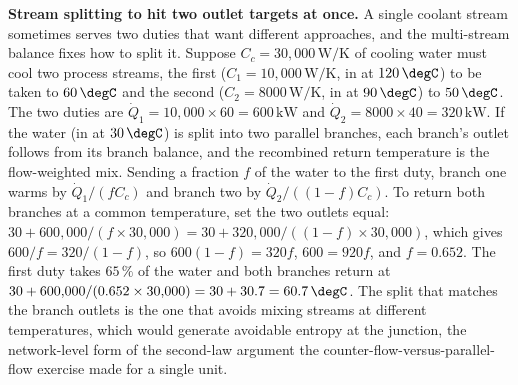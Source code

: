 \textbf{Stream splitting to hit two outlet targets at once.} A single coolant
stream sometimes serves two duties that want different approaches, and the
multi-stream balance fixes how to split it. Suppose $C_c = 30{,}000\,\si{\watt\per
\kelvin}$ of cooling water must cool two process streams, the first ($C_1 =
10{,}000\,\si{\watt\per\kelvin}$, in at $120\,\degC$) to be taken to $60\,\degC$
and the second ($C_2 = 8000\,\si{\watt\per\kelvin}$, in at $90\,\degC$) to $50\,
\degC$. The two duties are $\dot{Q}_1 = 10{,}000\times 60 = 600\,\text{kW}$ and
$\dot{Q}_2 = 8000\times 40 = 320\,\text{kW}$. If the water (in at $30\,\degC$) is
split into two parallel branches, each branch's outlet follows from its branch
balance, and the recombined return temperature is the flow-weighted mix. Sending a
fraction $f$ of the water to the first duty, branch one warms by $\dot{Q}_1/(f
C_c)$ and branch two by $\dot{Q}_2/((1 - f)C_c)$. To return both branches at a
common temperature, set the two outlets equal: $30 + 600{,}000/(f\times 30{,}000) =
30 + 320{,}000/((1 - f)\times 30{,}000)$, which gives $600/f = 320/(1 - f)$, so
$600(1 - f) = 320 f$, $600 = 920 f$, and $f = 0.652$. The first duty takes
$65\,\%$ of the water and both branches return at $30 + 600{,}000/(0.652\times
30{,}000) = 30 + 30.7 = 60.7\,\degC$. The split that matches the branch outlets is
the one that avoids mixing streams at different temperatures, which would generate
avoidable entropy at the junction, the network-level form of the second-law
argument the counter-flow-versus-parallel-flow exercise made for a single unit.

